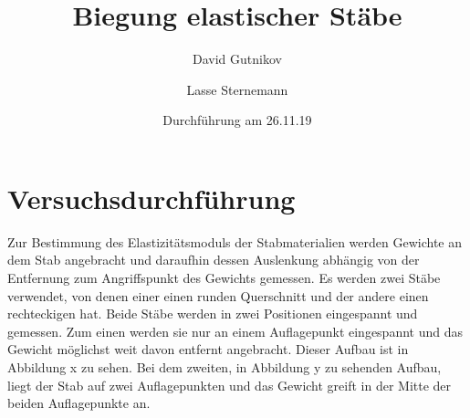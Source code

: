 \documentclass[titlepage = firstcover]{scrartcl}
\title{Biegung elastischer Stäbe}
\author{David Gutnikov \and Lasse Sternemann}
\date{Durchführung am 26.11.19}
\begin{document}
    \maketitle
    \tableofcontents
    \newpage

    \section{Versuchsdurchführung}
    Zur Bestimmung des Elastizitätsmoduls der Stabmaterialien werden Gewichte an dem Stab angebracht und daraufhin dessen Auslenkung abhängig von der Entfernung
    zum Angriffspunkt des Gewichts gemessen. Es werden zwei Stäbe verwendet, von denen einer einen runden Querschnitt und der andere einen rechteckigen hat. Beide
    Stäbe werden in zwei Positionen eingespannt und gemessen. Zum einen werden sie nur an einem Auflagepunkt eingespannt und das Gewicht möglichst weit davon entfernt
    angebracht. Dieser Aufbau ist in Abbildung x zu sehen. Bei dem zweiten, in Abbildung y zu sehenden Aufbau, liegt der Stab auf zwei Auflagepunkten und das
    Gewicht greift in der Mitte der beiden Auflagepunkte an.\newline
\end{document}
